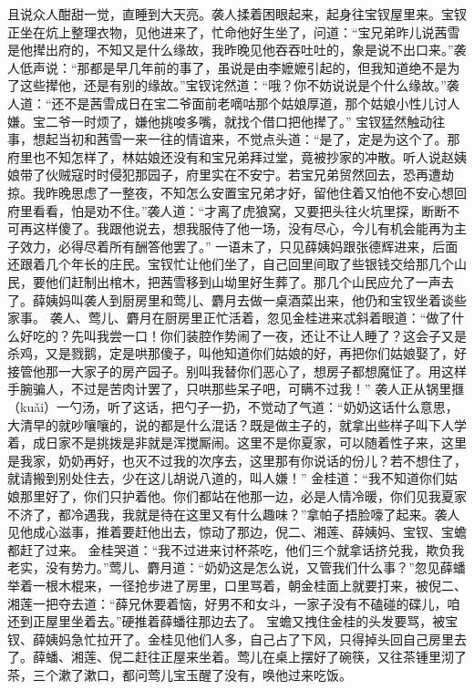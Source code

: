 \documentclass[12pt,oneside]{book}
\begin{document}
且说众人酣甜一觉，直睡到大天亮。袭人揉着困眼起来，起身往宝钗屋里来。宝钗正坐在炕上整理衣物，见他进来了，忙命他好生坐了，问道：“宝兄弟昨儿说茜雪是他撵出府的，不知又是什么缘故，我昨晚见他吞吞吐吐的，象是说不出口来。”袭人低声说：“那都是早几年前的事了，虽说是由李嬷嬷引起的，但我知道绝不是为了这些撵他，还是有别的缘故。”宝钗诧然道：“哦？你不妨说说是个什么缘故。”袭人道：“还不是茜雪成日在宝二爷面前老嘀咕那个姑娘厚道，那个姑娘小性儿讨人嫌。宝二爷一时烦了，嫌他挑唆多嘴，就找个借口把他撵了。”
宝钗猛然触动往事，想起当初和茜雪一来一往的情谊来，不觉点头道：“是了，定是为这个了。那府里也不知怎样了，林姑娘还没有和宝兄弟拜过堂，竟被抄家的冲散。听人说赵姨娘带了伙贼寇时时侵犯那园子，府里实在不安宁。若宝兄弟贸然回去，恐再遭劫掠。我昨晚思虑了一整夜，不知怎么安置宝兄弟才好，留他住着又怕他不安心想回府里看看，怕是劝不住。”袭人道：“才离了虎狼窝，又要把头往火坑里探，断断不可再这样傻了。我跟他说去，想我服侍了他一场，没有尽心，今儿有机会能再为主子效力，必得尽着所有酬答他罢了。”
一语未了，只见薛姨妈跟张德辉进来，后面还跟着几个年长的庄民。宝钗忙让他们坐了，自己回里间取了些银钱交给那几个山民，要他们赶制出棺木，把茜雪移到山坳里好生葬了。那几个山民应允了一声去了。薛姨妈叫袭人到厨房里和莺儿、麝月去做一桌酒菜出来，他仍和宝钗坐着谈些家事。
袭人、莺儿、麝月在厨房里正忙活着，忽见金桂进来忒斜着眼道：“做了什么好吃的？先叫我尝一口！你们装腔作势闹了一夜，还让不让人睡了？这会子又是杀鸡，又是戮鹅，定是哄那傻子，叫他知道你们姑娘的好，再把你们姑娘娶了，好接管他那一大家子的房产园子。别叫我替你们恶心了，想房子都想魔怔了。用这样手腕骗人，不过是苦肉计罢了，只哄那些呆子吧，可瞒不过我！”
袭人正从锅里擓（kuǎi）一勺汤，听了这话，把勺子一扔，不觉动了气道：“奶奶这话什么意思，大清早的就吵嚷嚷的，说的都是什么混话？既是做主子的，就拿出些样子叫下人学着，成日家不是挑拨是非就是浑搅厮闹。这里不是你夏家，可以随着性子来，这里是我家，奶奶再好，也灭不过我的次序去，这里那有你说话的份儿？若不想住了，就请搬到别处住去，少在这儿胡说八道的，叫人嫌！”
金桂道：“我不知道你们姑娘那里好了，你们只护着他。你们都站在他那一边，必是人情冷暖，你们见我夏家不济了，都冷遇我，我就是待在这里又有什么趣味？”拿帕子捂脸嚎了起来。袭人见他成心滋事，推着要赶他出去，惊动了那边，倪二、湘莲、薛姨妈、宝钗、宝蟾都赶了过来。
金桂哭道：“我不过进来讨杯茶吃，他们三个就拿话挤兑我，欺负我老实，没有势力。”莺儿、麝月道：“奶奶这是怎么说，又管我们什么事？”忽见薛蟠举着一根木棍来，一径抢步进了房里，口里骂着，朝金桂面上就要打来，被倪二、湘莲一把夺去道：“薛兄休要着恼，好男不和女斗，一家子没有不磕碰的碟儿，咱还到正屋里坐着去。”硬推着薛蟠往那边去了。
宝蟾又拽住金桂的头发要骂，被宝钗、薛姨妈急忙拉开了。金桂见他们人多，自己占了下风，只得掉头回自己房里去了。薛蟠、湘莲、倪二赶往正屋来坐着。莺儿在桌上摆好了碗筷，又往茶锺里沏了茶，三个漱了漱口，都问莺儿宝玉醒了没有，唤他过来吃饭。
\end{document}
